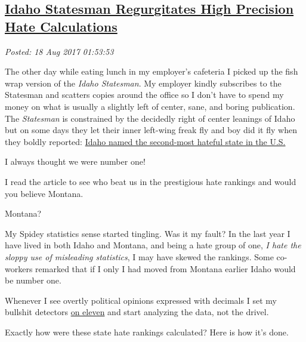 %

\subsection*{\href{https://analyzethedatanotthedrivel.org/2017/08/17/idaho-statesman-regurgitates-high-precision-hate-calculations/}{Idaho Statesman Regurgitates High Precision Hate Calculations}}


\noindent\emph{Posted: 18 Aug 2017 01:53:53}
\vspace{6pt}


The other day while eating lunch in my employer's cafeteria I picked up
the fish wrap version of the \emph{Idaho Statesman}. My employer kindly
subscribes to the Statesman and scatters copies around the office so I
don't have to spend my money on what is usually a slightly left of
center, sane, and boring publication. The \textit{Statesman} is constrained by
the decidedly right of center leanings of Idaho but on some days they
let their inner left-wing freak fly and boy did it fly when they boldly
reported:
\href{http://www.idahostatesman.com/news/state/idaho/article167378712.html}{Idaho
named the second-most hateful state in the U.S.}

I always thought we were number one!

I read the article to see who beat us in the prestigious hate rankings
and would you believe Montana.

Montana?

My Spidey statistics sense started tingling. Was it my fault? In the
last year I have lived in both Idaho and Montana, and being a hate group
of one, \emph{I hate the sloppy use of misleading statistics}, I may
have skewed the rankings. Some co-workers remarked that if I only I had
moved from Montana earlier Idaho would be number one.

Whenever I see overtly political opinions expressed with decimals I set
my bullshit detectors
\href{https://www.youtube.com/watch?v=4xgx4k83zzc}{on eleven} and start
analyzing the data, not the drivel.

Exactly how were these state hate rankings calculated? Here is how it's
done.

